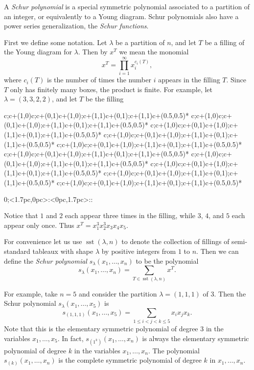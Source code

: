 \documentclass[12pt]{article}
\makeatletter
\DeclareMathOperator{\sst}{sst}
\def\drawsqlat{%
\begin{xy}{
0;<1.7pc,0pc>:<0pc,1.7pc>::
\xylattice{0}{9}{0}{9}}
\end{xy}}
\def\drawsq{\ar@{-}c;c+(1,0)\ar@{-}c;c+(0,1)\ar@{-}c+(1,0);c+(1,1)\ar@{-}c+(0,1);c+(1,1)}
\def\drawsqlabel#1{\save c+(0.5,0.5)*\txt<2pc>{#1} \restore}
\makeatother
\begin{document}
A \emph{Schur polynomial} is a special symmetric polynomial associated
to a partition of an integer, or equivalently to a Young diagram.
Schur polynomials also have a power series generalization, the
\emph{Schur functions}.

First we define some notation.  Let $\lambda$ be a partition of $n$,
and let $T$ be a filling of the Young diagram for $\lambda$.  Then by
$x^T$ we mean the monomial
\[
x^T = \prod_{i=1}^{\infty} x_i^{c_i(T)},
\]
where $c_i(T)$ is the number of times the number $i$ appears in the
filling $T$.  Since $T$ only has finitely many boxes, the product is
finite.  For example, let $\lambda = (3,3,2,2)$, and let $T$ be the
filling
\begin{center}
\begin{renewcommand}{\latticebody}{%
\ifnum{} \ifnum{} \drawsq\drawsqlabel{2} \fi\fi
\ifnum{} \ifnum{} \drawsq\drawsqlabel{4} \fi\fi
\ifnum{} \ifnum{} \drawsq\drawsqlabel{1} \fi\fi
\ifnum{} \ifnum{} \drawsq\drawsqlabel{5} \fi\fi
\ifnum{} \ifnum{} \drawsq\drawsqlabel{2} \fi\fi
\ifnum{} \ifnum{} \drawsq\drawsqlabel{3} \fi\fi
\ifnum{} \ifnum{} \drawsq\drawsqlabel{1} \fi\fi
\ifnum{} \ifnum{} \drawsq\drawsqlabel{4} \fi\fi
\ifnum{} \ifnum{} \drawsq\drawsqlabel{1} \fi\fi
\ifnum{} \ifnum{} \drawsq\drawsqlabel{2} \fi\fi
}
\drawsqlat
\end{renewcommand}
\end{center}
Notice that $1$ and $2$ each appear three times in the filling, while
$3$, $4$, and $5$ each appear only once.  Thus $x^T = x_1^3 x_2^3 x_3
x_4 x_5$.

For convenience let us use $\sst(\lambda, n)$ to denote the collection
of fillings of semi-standard tableaux with shape $\lambda$ by positive
integers from $1$ to $n$.  Then we can define the \emph{Schur
polynomial} $s_{\lambda}(x_1,\dots,x_n)$ to be the polynomial
\[
s_{\lambda}(x_1,\dots,x_n) = \sum_{T\in\sst(\lambda, n)} x^T.
\]

For example, take $n=5$ and consider the partition $\lambda = (1, 1,
1)$ of $3$.  Then the Schur polynomial $s_{\lambda}(x_1,\dots, x_5)$
is
\[
s_{(1,1,1)}(x_1,\dots,x_5) = \sum_{1\le i < j < k\le 5} x_i x_j x_k.
\]
Note that this is the elementary symmetric polynomial of degree 3 in
the variables $x_1,\dots,x_5$.  In fact, $s_{(1^k)}(x_1,\dots,x_n)$ is
always the elementary symmetric polynomial of degree $k$ in the
variables $x_1,\dots,x_n$.  The polynomial $s_{(k)}(x_1,\dots,x_n)$ is 
the complete symmetric polynomial of degree $k$ in $x_1,\dots,x_n$.
\end{document}
